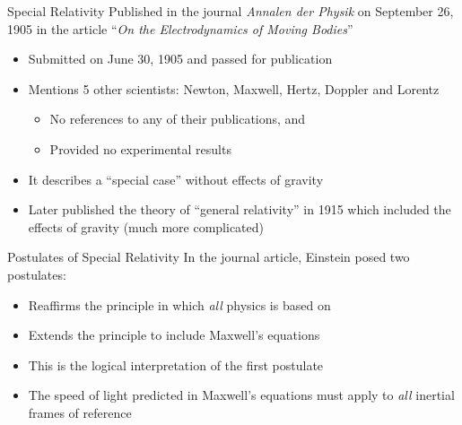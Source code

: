 \documentclass[12pt,compress,aspectratio=169]{beamer}
\begin{document}
\begin{frame}{Special Relativity}
  \vspace{.15in}Published in the journal \emph{Annalen der Physik} on September
  26, 1905 in the article ``\emph{On the Electrodynamics of Moving Bodies}''
  \begin{itemize}
  \item Submitted on June 30, 1905 and passed for publication
  \item Mentions 5 other scientists: Newton, Maxwell, Hertz, Doppler and Lorentz
    \begin{itemize}
    \item No references to any of their publications, and
    \item Provided no experimental results
    \end{itemize}
  \item It describes a ``special case'' without effects of gravity
  \item Later published the theory of ``general relativity'' in 1915 which
    included the effects of gravity (much more complicated)
  \end{itemize}
\end{frame}



\begin{frame}{Postulates of Special Relativity}
  In the journal article, Einstein posed two postulates:
  \begin{center}
  \end{center}
  \begin{itemize}
  \item Reaffirms the principle in which \emph{all} physics is based on
  \item Extends the principle to include Maxwell's equations
  \end{itemize}
  \begin{center}
  \end{center}
  \begin{itemize}
  \item This is the logical interpretation of the first postulate
  \item The speed of light predicted in Maxwell's equations must apply to
    \emph{all} inertial frames of reference
  \end{itemize}
\end{frame}
\end{document}
